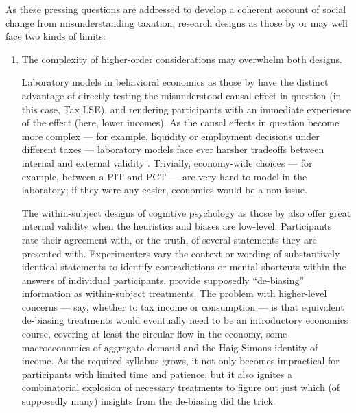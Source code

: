 As these pressing questions are addressed to develop a coherent account of social change from misunderstanding taxation, research
designs as those by \citeauthor{McCafferyBaron2004} or \citeauthor{SausgruberTyran2011} may well face two kinds of limits:
\begin{enumerate}
	\item The complexity of higher-order considerations may overwhelm both designs. 
	
	Laboratory models in behavioral economics as those by \citeauthor{SausgruberTyran2011} have the distinct advantage of directly testing the misunderstood causal effect in question (in this case, \gls{Tax LSE}), and rendering participants with an immediate experience of the effect (here, lower incomes).
	As the causal effects in question become more complex --- for example, liquidity or employment decisions under different taxes --- laboratory models face ever harsher tradeoffs between internal and external validity \citep[for a review and dissenting opinion, see][]{Jimenez-Buedo2010}.
	Trivially, economy-wide choices --- for example, between a \gls{PIT} and \gls{PCT} --- are very hard to model in the laboratory; if they were any easier, economics would be a non-issue.
	
	The within-subject designs of cognitive psychology as those by \citeauthor{McCafferyBaron2004} also offer great internal validity when the heuristics and biases are low-level.
	Participants rate their agreement with, or the truth, of several statements they are presented with.
	Experimenters vary the context or wording of substantively identical statements to identify contradictions or mental shortcuts within the answers of individual participants.
	\citeauthor{McCafferyBaron2004} provide supposedly ``de-biasing'' information as within-subject treatments.
	The problem with higher-level concerns --- say, whether to tax income or consumption --- is that equivalent de-biasing treatments would eventually need to be an introductory economics course, covering at least the circular flow in the economy, some macroeconomics of aggregate demand and the Haig-Simons identity of income.
	As the required syllabus grows, it not only becomes impractical for participants with limited time and patience, but it also ignites a combinatorial explosion of necessary treatments to figure out just which (of supposedly many) insights from the de-biasing did the trick.
	

\end{enumerate}
